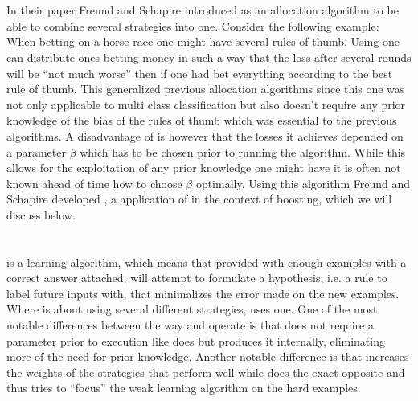 \newpage \section{\hedge}
In their paper Freund and Schapire introduced \hedge as an allocation algorithm to be able to combine several strategies into one. Consider the following example: When betting on a horse race one might have several rules of thumb. Using \hedge one can distribute ones betting money in such a way that the loss after several rounds will be ``not much worse'' then if one had bet everything according to the best rule of thumb. This generalized previous allocation algorithms since this one was not only applicable to multi class classification but also doesn't require any prior knowledge of the bias of the rules of thumb which was essential to the previous algorithms. A disadvantage of \hedge is however that the losses it achieves depended on a parameter $\beta$ which has to be chosen prior to running the algorithm. While this allows for the exploitation of any prior knowledge one might have it is often not known ahead of time how to choose $\beta$ optimally. Using this \hedge algorithm Freund and Schapire developed \adaB, a application of \hedge in the context of boosting, which we will discuss below. 

\section{\adaB}
\adaB is a learning algorithm, which means that provided with enough examples with a correct answer attached, \adaB will attempt to formulate a hypothesis, i.e. a rule to label future inputs with, that minimalizes the error made on the new examples. Where \hedge is about using several different strategies, \adaB uses one. One of the most notable differences between the way \hedge and \adaB operate is that \adaB does not require a parameter prior to execution like \hedge does but produces it internally, eliminating more of the need for prior knowledge. Another notable difference is that \hedge increases the weights of the strategies that perform well while \adaB does the exact opposite and thus tries to ``focus'' the weak learning algorithm on the hard examples. 

